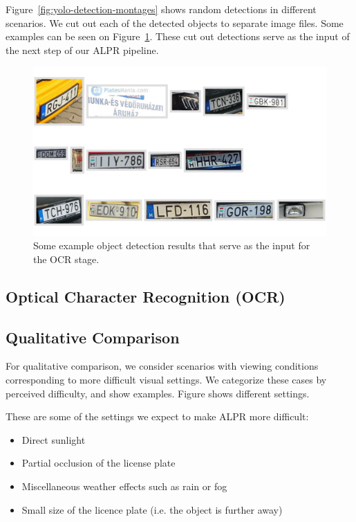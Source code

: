 Figure~\ref{fig:yolo-detection-montages}  shows random detections in different
scenarios. We cut out each of the detected objects to separate image files. Some
examples can be seen on Figure~\ref{fig:cutout-montage}.
These cut out detections serve as the input of the next step of our \ac{ALPR}
pipeline.
\begin{figure}
    \includegraphics[width=\textwidth]{figures/yolo/cutout_montage.jpg}
    \caption{Some example object detection results that serve as the
    input for the OCR stage.}
    \label{fig:cutout-montage}
\end{figure}

\subsection{Optical Character Recognition (OCR)}

\subsection{Qualitative Comparison}
For qualitative comparison, we consider scenarios with viewing conditions
corresponding to more difficult visual settings. We categorize these cases by
perceived difficulty, and show examples. Figure  shows
different settings. 

These are some of the settings we expect to make \ac{ALPR} more
difficult:
\begin{itemize}
    \item Direct sunlight 
    \item Partial occlusion of the license plate 
    \item Miscellaneous weather effects such as rain or fog
    \item Small size of the licence plate (i.e. the object is further away)
\end{itemize}

